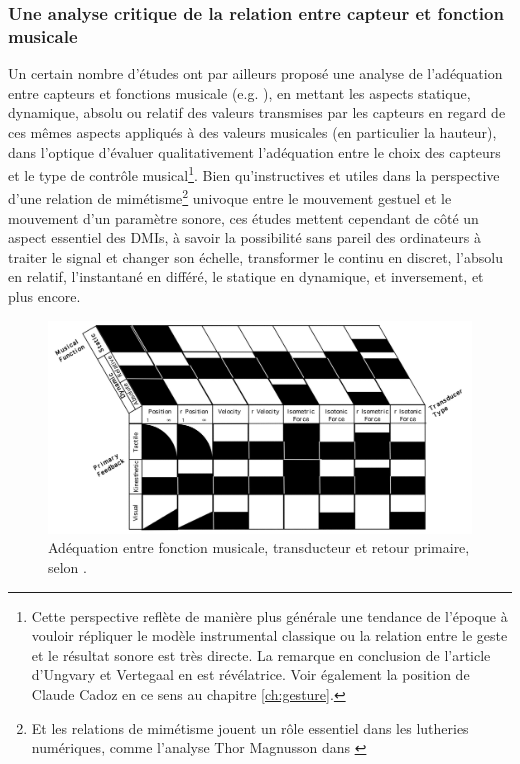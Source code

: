 \subsubsection{Une analyse critique de la relation entre capteur et fonction musicale}

\noindent Un certain nombre d'études ont par ailleurs proposé une analyse de l'adéquation entre capteurs et fonctions musicale (e.g. \cite{vertegaal_towards_1996, goudeseune_interpolated_2002}), en mettant les aspects statique, dynamique, absolu ou relatif des valeurs transmises par les capteurs en regard de ces mêmes aspects appliqués à des valeurs musicales (en particulier la hauteur), dans l'optique d'évaluer qualitativement l'adéquation entre le choix des capteurs et le type de contrôle musical\footnote{Cette perspective reflète de manière plus générale une tendance de l'époque à vouloir répliquer le modèle instrumental classique ou la relation entre le geste et le résultat sonore est très directe. La remarque en conclusion de l'article d'Ungvary et Vertegaal  en est révélatrice. Voir également la position de Claude Cadoz en ce sens au chapitre \ref{ch:gesture}.}. Bien qu'instructives et utiles dans la perspective d'une relation de mimétisme\footnote{Et les relations de mimétisme jouent un rôle essentiel dans les lutheries numériques, comme l'analyse Thor Magnusson dans \cite{magnusson_ergomimesis_2018}} univoque entre le mouvement gestuel et le mouvement d'un paramètre sonore, ces études mettent cependant de côté un aspect essentiel des \glspl{DMI}, à savoir la possibilité sans pareil des ordinateurs à traiter le signal et changer son échelle, transformer le continu en discret, l'absolu en relatif, l'instantané en différé, le statique en dynamique, et inversement, et plus encore.\\
\begin{figure}[!htbp]
	\captionsetup{format=plain}%
	\includegraphics[width=\textwidth]{gfx/05_interfaces/vertegaal-musical-function.png}
	\caption[Adéquation entre fonction musicale, transducteur et retour primaire]{Adéquation entre fonction musicale, transducteur et retour primaire, selon \cite{vertegaal_towards_1996}.}
	\label{fig:interface:vertegaal-transducer-function}
\end{figure}
